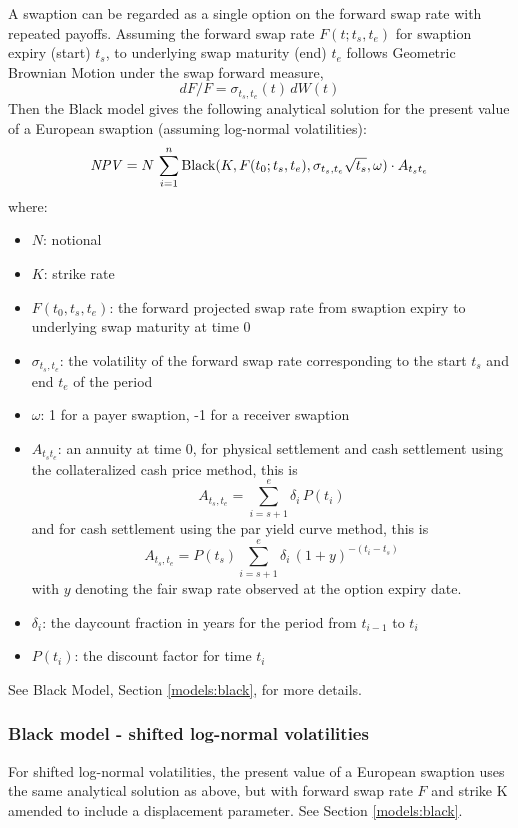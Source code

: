 A swaption can be regarded as a single option on the forward swap rate with 
repeated payoffs. Assuming the forward swap rate $F(t;t_s, t_e)$ for swaption 
expiry (start) $t_s$, to underlying swap maturity (end) $t_e$ follows 
Geometric Brownian Motion under the swap forward measure,
$$
dF / F = \sigma_{t_s,t_e}(t)\,dW(t)
$$
Then the Black model gives the following analytical solution for the present 
value of a European swaption (assuming log-normal volatilities):
$$
\mathit{NPV} = N \,\sum_{i=1}^n \mbox{Black}(K, F(t_0; t_s,t_e), \sigma_{t_s,t_e} \sqrt{t_s},\omega)\cdot A_{t_s t_e}
$$
where:
\begin{itemize}
\item $N$: notional
\item $K$: strike rate
\item $F(t_0,t_s,t_e)$: the forward projected swap rate from swaption expiry 
to underlying swap maturity at time 0 
\item $\sigma_{t_s,t_e}$: the volatility of the forward swap rate corresponding 
to the start $t_s$ and end $t_e$ of the period
\item $\omega$: 1 for a payer swaption, -1 for a receiver swaption
\item $A_{t_s t_e}$: an annuity at time 0, for physical settlement and cash settlement using the collateralized cash
  price method, this is
$$
A_{t_s, t_e} = \sum_{i=s+1}^e \delta_i\,P(t_i) 
$$
and for cash settlement using the par yield curve method, this is
$$
A_{t_s, t_e} = P(t_s) \sum_{i=s+1}^e \delta_i\,(1+y)^{-(t_i-t_s)}
$$
with $y$ denoting the fair swap rate observed at the option expiry date.
\item $\delta_i$: the daycount fraction in years for the period from $t_{i-1}$ to $t_i$
\item $P(t_i)$: the discount factor for time $t_i$
\end{itemize}

See Black Model, Section \ref{models:black}, for more details.

\subsubsection*{Black model - shifted log-normal volatilities}

For shifted log-normal volatilities, the present value of a European swaption 
uses the same analytical solution as above, but with forward swap rate $F$ and 
strike K amended to include a displacement parameter.  
See Section \ref{models:black}.

